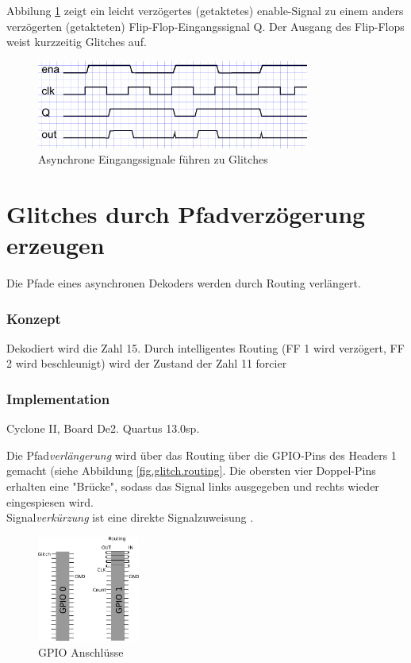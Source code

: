 Abbilung \ref{fig.glitch.bild1} zeigt ein leicht verzögertes (getaktetes) enable-Signal zu einem anders verzögerten (getakteten) Flip-Flop-Eingangssignal Q. Der Ausgang des Flip-Flops weist kurzzeitig Glitches auf. \\
\begin{figure}[H]
	\centering
	\includegraphics[width=0.8\textwidth]{images/glitch/def_glitch_3.png}
	\caption{Asynchrone Eingangssignale führen zu Glitches}
	\label{fig.glitch.bild1}
\end{figure}


\newpage
\section{Glitches durch Pfadverzögerung erzeugen}\label{sect.glitch_detect}
Die Pfade eines asynchronen Dekoders werden durch Routing verlängert.

\subsubsection{Konzept}
Dekodiert wird die Zahl 15. Durch intelligentes Routing (FF 1 wird verzögert, FF 2 wird beschleunigt) wird der Zustand der Zahl 11 forcier 

\subsubsection{Implementation} 
Cyclone II, Board De2. Quartus 13.0sp.

Die Pfad\textit{verlängerung} wird über das Routing über die GPIO-Pins des Headers 1 gemacht (siehe Abbildung \ref{fig.glitch.routing}. Die obersten vier Doppel-Pins erhalten eine "Brücke", sodass das Signal links ausgegeben und rechts wieder eingespiesen wird.\\
Signal\textit{verkürzung} ist eine direkte Signalzuweisung  .\\
\begin{figure}[H]
	\centering
	\includegraphics[width=0.3\textwidth]{images/glitch/GPIO_Belegung.png}
	\caption{GPIO Anschlüsse}
	\label{fig.glitch.GPIO}
\end{figure}


